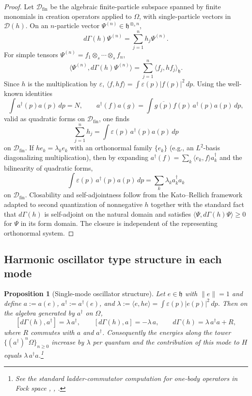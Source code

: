 \documentclass[11pt]{article}
\theoremstyle{definition}
\theoremstyle{plain}
\newtheorem{proposition}{Proposition}
\numberwithin{equation}{section}
\begin{document}
\begin{proof}
Let $\mathcal{D}_{\mathrm{fin}}$ be the algebraic finite-particle subspace spanned by finite monomials in creation operators applied to $\Omega$, with single-particle vectors in $\mathcal{D}(h)$. On an $n$-particle vector $\Psi^{(n)}\in \mathfrak{h}^{\otimes_s n}$,
\[
d\Gamma(h)\Psi^{(n)}=\sum_{j=1}^n h_j\Psi^{(n)}.
\]
For simple tensors $\Psi^{(n)}=f_1\otimes_s\cdots\otimes_s f_n$,
\[
\langle \Psi^{(n)}, d\Gamma(h)\Psi^{(n)}\rangle=\sum_{j=1}^n \langle f_j, h f_j\rangle_{\mathfrak{h}}.
\]
Since $h$ is the multiplication by $\varepsilon$, $\langle f, h f\rangle=\int \varepsilon(p)|f(p)|^2\,dp$. Using the well-known identities
\[
\int a^\dagger(p)a(p)\,dp = N,\qquad a^\dagger(f)a(g)=\int \overline{g(p)}f(p)\,a^\dagger(p)a(p)\,dp,
\]
valid as quadratic forms on $\mathcal{D}_{\mathrm{fin}}$, one finds
\[
\sum_{j=1}^n h_j = \int \varepsilon(p)\,a^\dagger(p)a(p)\,dp
\]
on $\mathcal{D}_{\mathrm{fin}}$. If $h e_k=\lambda_k e_k$ with an orthonormal family $\{e_k\}$ (e.g., an $L^2$-basis diagonalizing multiplication), then by expanding $a^\dagger(f)=\sum_k \langle e_k,f\rangle a_k^\dagger$ and the bilinearity of quadratic forms,
\[
\int \varepsilon(p)\,a^\dagger(p)a(p)\,dp=\sum_k \lambda_k a_k^\dagger a_k
\]
on $\mathcal{D}_{\mathrm{fin}}$. Closability and self-adjointness follow from the Kato--Rellich framework adapted to second quantization of nonnegative $h$ together with the standard fact that $d\Gamma(h)$ is self-adjoint on the natural domain and satisfies $\langle \Psi, d\Gamma(h)\Psi\rangle\ge 0$ for $\Psi$ in its form domain. The closure is independent of the representing orthonormal system.\end{proof}

\subsection{Harmonic oscillator type structure in each mode}

\begin{proposition}[Single-mode oscillator structure]
Let $e\in\mathfrak{h}$ with $\|e\|=1$ and define $a:=a(e)$, $a^\dagger:=a^\dagger(e)$, and $\lambda:=\langle e, h e\rangle = \int \varepsilon(p)|e(p)|^2\,dp$. Then on the algebra generated by $a^\dagger$ on $\Omega$,
\[
[d\Gamma(h),a^\dagger]=\lambda\,a^\dagger,\qquad [d\Gamma(h),a]=-\lambda\,a,\qquad d\Gamma(h)=\lambda\,a^\dagger a + R,
\]
where $R$ commutes with $a$ and $a^\dagger$. Consequently the energies along the tower $\{(a^\dagger)^n\Omega\}_{n\ge 0}$ increase by $\lambda$ per quantum and the contribution of this mode to $H$ equals $\lambda\,a^\dagger a$.\footnote{See the standard ladder-commutator computation for one-body operators in Fock space \cite[Sec.~1.4]{uiuc561}, \cite{scholarpedia}, \cite[Sec.~4.3]{libresecond}.}
\end{proposition}
\end{document}
